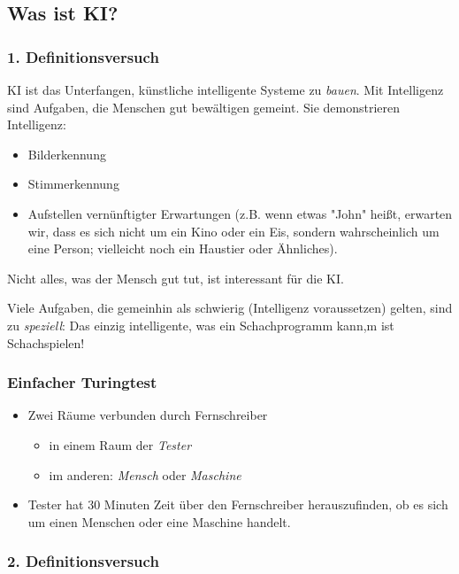 \documentclass[runningheads,deutsch]{llncs}
\begin{document}
\subsection{Was ist KI?}

\subsubsection{1. Definitionsversuch}

KI ist das Unterfangen, künstliche intelligente Systeme zu \textit{bauen}.
Mit Intelligenz sind Aufgaben, die Menschen gut bewältigen gemeint. Sie
demonstrieren Intelligenz:

\begin{itemize}
    \item Bilderkennung
    \item Stimmerkennung
    \item Aufstellen vernünftigter Erwartungen (z.B. wenn etwas "John" heißt, erwarten wir, dass es sich nicht um ein Kino oder ein Eis, sondern wahrscheinlich um eine Person; vielleicht noch ein Haustier oder Ähnliches). 
\end{itemize}

Nicht alles, was der Mensch gut tut, ist interessant für die KI. 

Viele Aufgaben, die gemeinhin als schwierig (Intelligenz voraussetzen) gelten, sind zu \textit{speziell}: Das einzig intelligente, was ein Schachprogramm kann,m ist Schachspielen!

\subsubsection{Einfacher Turingtest}
\begin{itemize}
    \item Zwei Räume verbunden durch Fernschreiber
    \begin{itemize}
        \item in einem Raum der \textit{Tester}
        \item im anderen: \textit{Mensch} oder \textit{Maschine}
    \end{itemize}
    \item Tester hat 30 Minuten Zeit über den Fernschreiber herauszufinden, ob es sich um einen Menschen oder eine Maschine handelt.
\end{itemize}

\subsubsection{2. Definitionsversuch}
\end{document}
